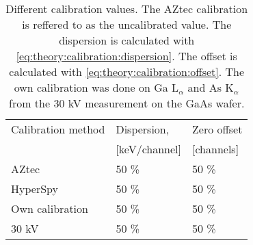 \begin{table}[ht]
    \centering
    \caption{
        Different calibration values.
        The AZtec calibration is reffered to as the uncalibrated value.
        The dispersion is calculated with \cref{eq:theory:calibration:dispersion}.
        The offset is calculated with \cref{eq:theory:calibration:offset}.
        The own calibration was done on Ga L$_\alpha$ and As K$_\alpha$ from the 30 kV measurement on the GaAs wafer.
    }
    \label{tab:results:calibrations}
    \begin{tabular}{m{4cm} m{2cm} m{2cm}}
        Calibration method & Dispersion,   & Zero offset \\
                           & [keV/channel] & [channels]  \\
        \hline
        AZtec              & 50 \%         & 50 \%       \\
        HyperSpy           & 50 \%         & 50 \%       \\
        Own calibration    & 50 \%         & 50 \%       \\
        30 kV              & 50 \%         & 50 \%
    \end{tabular}
\end{table}
